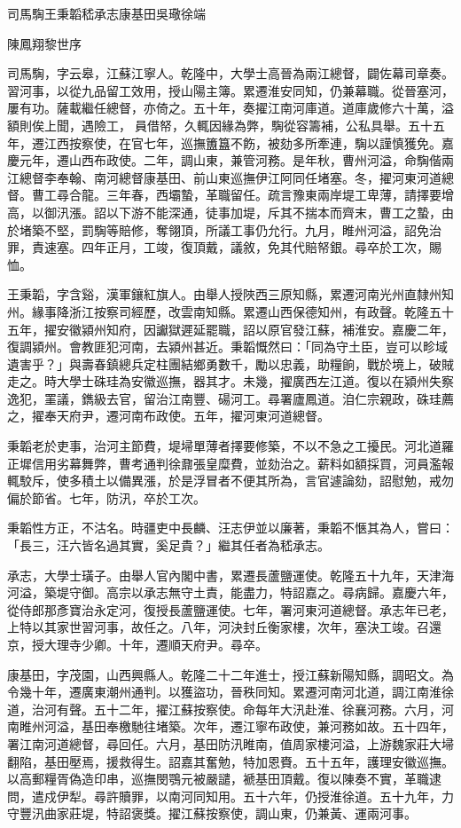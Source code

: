 
\begin{pinyinscope}
司馬騊王秉韜嵇承志康基田吳璥徐端

陳鳳翔黎世序

司馬騊，字云皋，江蘇江寧人。乾隆中，大學士高晉為兩江總督，闢佐幕司章奏。習河事，以從九品留工效用，授山陽主簿。累遷淮安同知，仍兼幕職。從晉塞河，屢有功。薩載繼任總督，亦倚之。五十年，奏擢江南河庫道。道庫歲修六十萬，溢額則俟上聞，遇險工，員借帑，久輒因緣為弊，騊從容籌補，公私具舉。五十五年，遷江西按察使，在官七年，巡撫簠簋不飭，被劾多所牽連，騊以謹慎獲免。嘉慶元年，遷山西布政使。二年，調山東，兼管河務。是年秋，曹州河溢，命騊偕兩江總督李奉翰、南河總督康基田、前山東巡撫伊江阿同任堵塞。冬，擢河東河道總督。曹工尋合龍。三年春，西壩蟄，革職留任。疏言豫東兩岸堤工卑薄，請擇要增高，以御汛漲。詔以下游不能深通，徒事加堤，斥其不揣本而齊末，曹工之蟄，由於堵築不堅，罰騊等賠修，奪翎頂，所議工事仍允行。九月，睢州河溢，詔免治罪，責速塞。四年正月，工竣，復頂戴，議敘，免其代賠帑銀。尋卒於工次，賜恤。

王秉韜，字含谿，漢軍鑲紅旗人。由舉人授陜西三原知縣，累遷河南光州直隸州知州。緣事降浙江按察司經歷，改雲南知縣。累遷山西保德知州，有政聲。乾隆五十五年，擢安徽潁州知府，因讞獄遲延罷職，詔以原官發江蘇，補淮安。嘉慶二年，復調潁州。會教匪犯河南，去潁州甚近。秉韜慨然曰：「同為守土臣，豈可以畛域遺害乎？」與壽春鎮總兵定柱團結鄉勇數千，勵以忠義，助糧餉，戰於境上，破賊走之。時大學士硃珪為安徽巡撫，器其才。未幾，擢廣西左江道。復以在潁州失察逸犯，罣議，鐫級去官，留治江南豐、碭河工。尋署廬鳳道。洎仁宗親政，硃珪薦之，擢奉天府尹，遷河南布政使。五年，擢河東河道總督。

秉韜老於吏事，治河主節費，堤埽單薄者擇要修築，不以不急之工擾民。河北道羅正墀信用劣幕舞弊，曹考通判徐鼐張皇糜費，並劾治之。薪料如額採買，河員濫報輒駮斥，使多積土以備異漲，於是浮冒者不便其所為，言官遽論劾，詔慰勉，戒勿偏於節省。七年，防汛，卒於工次。

秉韜性方正，不沽名。時疆吏中長麟、汪志伊並以廉著，秉韜不愜其為人，嘗曰：「長三，汪六皆名過其實，奚足貴？」繼其任者為嵇承志。

承志，大學士璜子。由舉人官內閣中書，累遷長蘆鹽運使。乾隆五十九年，天津海河溢，築堤守御。高宗以承志無守土責，能盡力，特詔嘉之。尋病歸。嘉慶六年，從侍郎那彥寶治永定河，復授長蘆鹽運使。七年，署河東河道總督。承志年已老，上特以其家世習河事，故任之。八年，河決封丘衡家樓，次年，塞決工竣。召還京，授大理寺少卿。十年，遷順天府尹。尋卒。

康基田，字茂園，山西興縣人。乾隆二十二年進士，授江蘇新陽知縣，調昭文。為令幾十年，遷廣東潮州通判。以獲盜功，晉秩同知。累遷河南河北道，調江南淮徐道，治河有聲。五十二年，擢江蘇按察使。命每年大汛赴淮、徐襄河務。六月，河南睢州河溢，基田奉檄馳往堵築。次年，遷江寧布政使，兼河務如故。五十四年，署江南河道總督，尋回任。六月，基田防汛睢南，值周家樓河溢，上游魏家莊大埽翻陷，基田壓焉，援救得生。詔嘉其奮勉，特加恩賚。五十五年，護理安徽巡撫。以高郵糧胥偽造印串，巡撫閔鶚元被嚴譴，褫基田頂戴。復以陳奏不實，革職逮問，遣戍伊犁。尋許贖罪，以南河同知用。五十六年，仍授淮徐道。五十九年，力守豐汛曲家莊堤，特詔褒獎。擢江蘇按察使，調山東，仍兼黃、運兩河事。


\end{pinyinscope}
